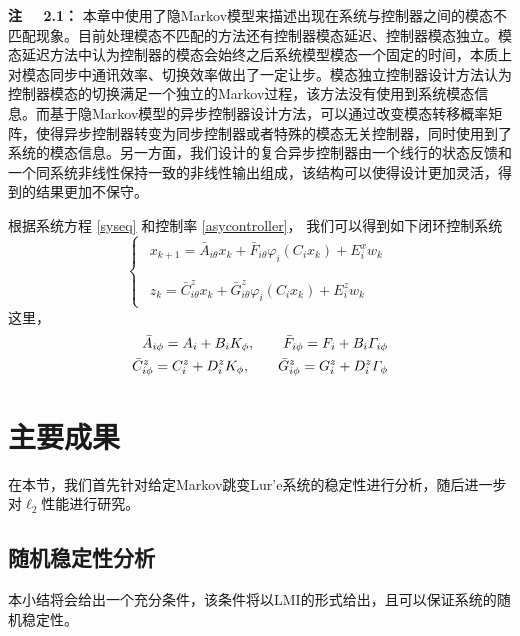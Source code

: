 	{\bf 注 \ \ 2.1：} 
	本章中使用了隐Markov模型来描述出现在系统与控制器之间的模态不匹配现象。目前处理模态不匹配的方法还有控制器模态延迟\cite{zhang2009stability}、控制器模态独立\cite{todorov2016new,wu2005mode,dolgov2017static}。模态延迟方法中认为控制器的模态会始终之后系统模型模态一个固定的时间，本质上对模态同步中通讯效率、切换效率做出了一定让步。模态独立控制器设计方法认为控制器模态的切换满足一个独立的Markov过程，该方法没有使用到系统模态信息。而基于隐Markov模型的异步控制器设计方法，可以通过改变模态转移概率矩阵，使得异步控制器转变为同步控制器或者特殊的模态无关控制器，同时使用到了系统的模态信息。另一方面，我们设计的复合异步控制器由一个线行的状态反馈和一个同系统非线性保持一致的非线性输出组成，该结构可以使得设计更加灵活，得到的结果更加不保守。
	
	根据系统方程 \eqref{syseq} 和控制率 \eqref{asycontroller}， 我们可以得到如下闭环控制系统
	\begin{equation}\label{close_system_equation_2}
	\left\{
	\begin{array}{lr}
	\begin{split}
	x_{k+1}=\bar{A}_{i\theta}x_k+\bar{F}_{i\theta}\varphi_{i}(C_ix_k)+E_i^xw_k\\
	\end{split}
	\\
	\begin{split}
	z_k=\bar{C}^{z}_{i\theta}x_k+\bar{G}^{z}_{i\theta}\varphi_{i}(C_ix_k)+E^z_iw_k
	\end{split}
	\end{array}
	\right.
	\end{equation} 
	这里，
	\begin{equation} \notag
	\begin{aligned}
	\bar{A}_{i\phi}=A_{i}+B_{i}K_{\phi},  \qquad \bar{F}_{i\phi}=F_{i}+B_{i}\varGamma_{i\phi} \\
	\bar{C}^{z}_{i\phi}=C^{z}_{i}+D^{z}_{i}K_{\phi}, \qquad \bar{G}^{z}_{i\phi}=G^{z}_{i}+D^{z}_{i}\varGamma_{\phi}
	\end{aligned}
	\end{equation}
	

\section{主要成果}
	在本节，我们首先针对给定Markov跳变Lur'e系统的稳定性进行分析，随后进一步对$\ell_2$性能进行研究。

\subsection{随机稳定性分析}
	本小结将会给出一个充分条件，该条件将以LMI的形式给出，且可以保证系统的随机稳定性。
	
